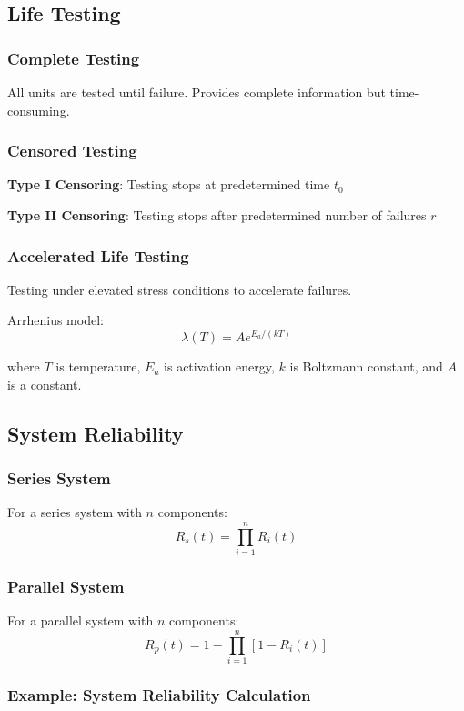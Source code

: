 \documentclass[twoside]{book}
\begin{document}
\subsection{Life Testing}

\subsubsection{Complete Testing}

All units are tested until failure. Provides complete information but time-consuming.

\subsubsection{Censored Testing}

\textbf{Type I Censoring}: Testing stops at predetermined time $t_0$

\textbf{Type II Censoring}: Testing stops after predetermined number of failures $r$

\subsubsection{Accelerated Life Testing}

Testing under elevated stress conditions to accelerate failures.

Arrhenius model:
$$\lambda(T) = A e^{E_a/(kT)}$$

where $T$ is temperature, $E_a$ is activation energy, $k$ is Boltzmann constant, and $A$ is a constant.

\subsection{System Reliability}

\subsubsection{Series System}

For a series system with $n$ components:
$$R_s(t) = \prod_{i=1}^{n} R_i(t)$$

\subsubsection{Parallel System}

For a parallel system with $n$ components:
$$R_p(t) = 1 - \prod_{i=1}^{n} [1 - R_i(t)]$$

\subsubsection{Example: System Reliability Calculation}
\end{document}
